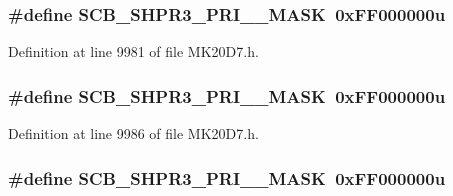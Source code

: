 \subsubsection[{\texorpdfstring{S\+C\+B\+\_\+\+S\+H\+P\+R3\+\_\+\+P\+R\+I\+\_\+15\+\_\+\+M\+A\+SK}{SCB_SHPR3_PRI_15_MASK}}]{\setlength{\rightskip}{0pt plus 5cm}\#define S\+C\+B\+\_\+\+S\+H\+P\+R3\+\_\+\+P\+R\+I\+\_\+\_\+\+M\+A\+SK~0x\+F\+F000000u}\hypertarget{group___s_c_b___register___masks_gad0d8244bc4b757250164da7a7f5406ce}{}\label{group___s_c_b___register___masks_gad0d8244bc4b757250164da7a7f5406ce}


Definition at line 9981 of file M\+K20\+D7.\+h.

\subsubsection[{\texorpdfstring{S\+C\+B\+\_\+\+S\+H\+P\+R3\+\_\+\+P\+R\+I\+\_\+15\+\_\+\+M\+A\+SK}{SCB_SHPR3_PRI_15_MASK}}]{\setlength{\rightskip}{0pt plus 5cm}\#define S\+C\+B\+\_\+\+S\+H\+P\+R3\+\_\+\+P\+R\+I\+\_\+\_\+\+M\+A\+SK~0x\+F\+F000000u}\hypertarget{group___s_c_b___register___masks_gad0d8244bc4b757250164da7a7f5406ce}{}\label{group___s_c_b___register___masks_gad0d8244bc4b757250164da7a7f5406ce}


Definition at line 9986 of file M\+K20\+D7.\+h.

\subsubsection[{\texorpdfstring{S\+C\+B\+\_\+\+S\+H\+P\+R3\+\_\+\+P\+R\+I\+\_\+15\+\_\+\+M\+A\+SK}{SCB_SHPR3_PRI_15_MASK}}]{\setlength{\rightskip}{0pt plus 5cm}\#define S\+C\+B\+\_\+\+S\+H\+P\+R3\+\_\+\+P\+R\+I\+\_\+\_\+\+M\+A\+SK~0x\+F\+F000000u}\hypertarget{group___s_c_b___register___masks_gad0d8244bc4b757250164da7a7f5406ce}{}\label{group___s_c_b___register___masks_gad0d8244bc4b757250164da7a7f5406ce}


